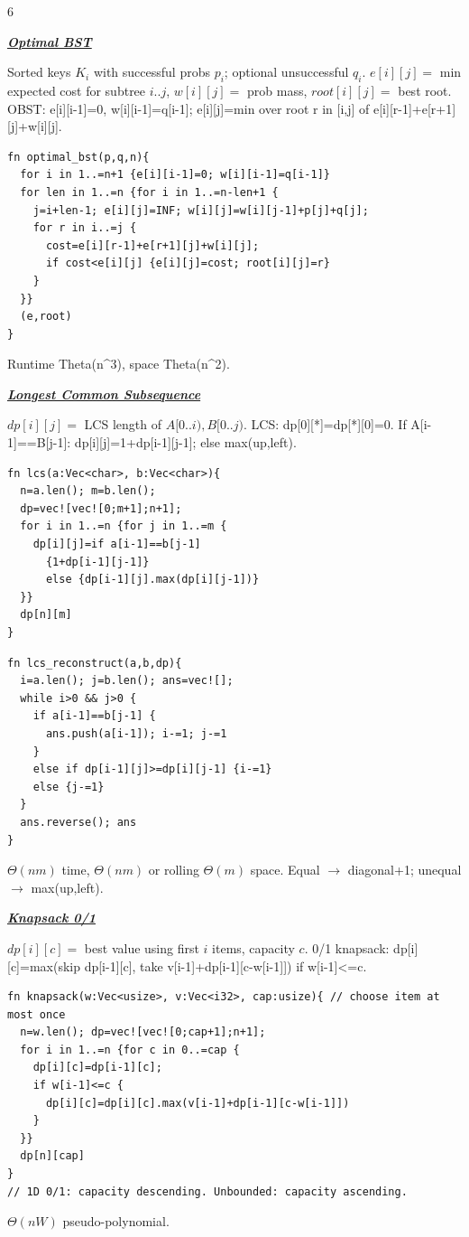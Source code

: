 \documentclass[a4paper,landscape]{article}
\renewcommand{\textbf}[1]{\underline{#1}}
\newcommand{\subsectionsize}{\fontsize{3.92}{4.02}\selectfont}
\newcommand{\subsectiontitle}[1]{%
  \par\vspace{0pt}%
  {\subsectionsize\bfseries\itshape\textbf{#1}}\par%
  \vspace{0pt}%
}
\begin{document}
\begin{multicols*}{6}
\subsectiontitle{Optimal BST}
Sorted keys $K_i$ with successful probs $p_i$; optional unsuccessful $q_i$. $e[i][j]=$ min expected cost for subtree $i..j$, $w[i][j]=$ prob mass, $root[i][j]=$ best root.
OBST: e[i][i-1]=0, w[i][i-1]=q[i-1]; e[i][j]=min over root r in [i,j] of e[i][r-1]+e[r+1][j]+w[i][j].
\begin{lstlisting}[aboveskip=0pt,belowskip=0pt]
fn optimal_bst(p,q,n){
  for i in 1..=n+1 {e[i][i-1]=0; w[i][i-1]=q[i-1]}
  for len in 1..=n {for i in 1..=n-len+1 {
    j=i+len-1; e[i][j]=INF; w[i][j]=w[i][j-1]+p[j]+q[j];
    for r in i..=j {
      cost=e[i][r-1]+e[r+1][j]+w[i][j];
      if cost<e[i][j] {e[i][j]=cost; root[i][j]=r}
    }
  }}
  (e,root)
}
\end{lstlisting}
Runtime Theta(n\textasciicircum3), space Theta(n\textasciicircum 2).

\subsectiontitle{Longest Common Subsequence}
$dp[i][j]=$ LCS length of $A[0..i),B[0..j)$.
LCS: dp[0][*]=dp[*][0]=0. If A[i-1]==B[j-1]: dp[i][j]=1+dp[i-1][j-1]; else max(up,left).\\
\noindent
\begin{minipage}[t]{0.49\linewidth}\vspace{0pt}
\begin{lstlisting}[aboveskip=0pt,belowskip=0pt]
fn lcs(a:Vec<char>, b:Vec<char>){
  n=a.len(); m=b.len();
  dp=vec![vec![0;m+1];n+1];
  for i in 1..=n {for j in 1..=m {
    dp[i][j]=if a[i-1]==b[j-1]
      {1+dp[i-1][j-1]}
      else {dp[i-1][j].max(dp[i][j-1])}
  }}
  dp[n][m]
}
\end{lstlisting}
\end{minipage}\hfill
\begin{minipage}[t]{0.49\linewidth}\vspace{0pt}
\begin{lstlisting}[aboveskip=0pt,belowskip=0pt]
fn lcs_reconstruct(a,b,dp){
  i=a.len(); j=b.len(); ans=vec![];
  while i>0 && j>0 {
    if a[i-1]==b[j-1] {
      ans.push(a[i-1]); i-=1; j-=1
    }
    else if dp[i-1][j]>=dp[i][j-1] {i-=1}
    else {j-=1}
  }
  ans.reverse(); ans
}
\end{lstlisting}
\end{minipage}
$\Theta(nm)$ time, $\Theta(nm)$ or rolling $\Theta(m)$ space. Equal $\to$ diagonal+1; unequal $\to$ max(up,left).

\subsectiontitle{Knapsack 0/1}
$dp[i][c]=$ best value using first $i$ items, capacity $c$.
0/1 knapsack: dp[i][c]=max(skip dp[i-1][c], take v[i-1]+dp[i-1][c-w[i-1]]) if w[i-1]<=c.
\begin{lstlisting}[aboveskip=0pt,belowskip=0pt]
fn knapsack(w:Vec<usize>, v:Vec<i32>, cap:usize){ // choose item at most once
  n=w.len(); dp=vec![vec![0;cap+1];n+1];
  for i in 1..=n {for c in 0..=cap {
    dp[i][c]=dp[i-1][c];
    if w[i-1]<=c {
      dp[i][c]=dp[i][c].max(v[i-1]+dp[i-1][c-w[i-1]])
    }
  }}
  dp[n][cap]
}
// 1D 0/1: capacity descending. Unbounded: capacity ascending.
\end{lstlisting}
$\Theta(nW)$ pseudo-polynomial.


\end{multicols*}
\end{document}
